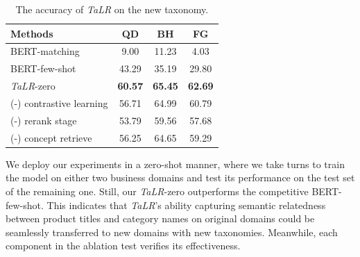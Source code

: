 \begin{table}[th]
  \caption{The accuracy of \textit{TaLR} on the new taxonomy. }
  \label{tb:zeroshot}
  \centering
  \begin{tabular}{l|ccc}
    \toprule
    Methods & QD & BH & FG \\
    \midrule
    BERT-matching & 9.00 & 11.23 & 4.03 \\
    BERT-few-shot & 43.29 & 35.19 & 29.80 \\
    \midrule
    \textit{TaLR}-zero & \textbf{60.57} & \textbf{65.45} & \textbf{62.69}\\
    (-) contrastive learning & 56.71 & 64.99 & 60.79\\
    (-) rerank stage & 53.79 & 59.56 & 57.68 \\
    (-) concept retrieve & 56.25 & 64.65 & 59.29\\
    \bottomrule
  \end{tabular}
\end{table}

We deploy our experiments in a zero-shot manner, where we take turns to train the model on either two business domains and test its performance on the test set of the remaining one. Still, our \textit{TaLR}-zero outperforms the competitive BERT-few-shot. 
This indicates that \textit{TaLR}'s ability capturing semantic relatedness between product titles and category names on original domains could be seamlessly transferred to new domains with new taxonomies.
Meanwhile, each component in the ablation test verifies its effectiveness. 


